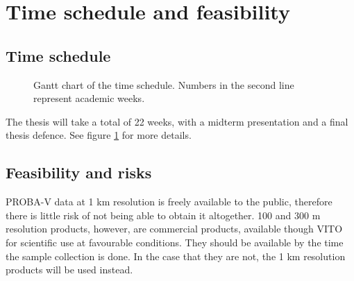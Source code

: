 \documentclass[a4paper,10pt]{article}
\begin{document}
\section{Time schedule and feasibility}

\subsection{Time schedule}

\begin{figure}
  \caption{Gantt chart of the time schedule. Numbers in the second line represent academic weeks.}
  \label{fig-gantt}
\end{figure}

The thesis will take a total of 22 weeks, with a midterm presentation and a final thesis defence. See figure \ref{fig-gantt} for more details.

\subsection{Feasibility and risks}

PROBA-V data at 1 km resolution is freely available to the public, therefore there is little risk of not being able to obtain it altogether. 100 and 300 m resolution products, however, are commercial products, available though VITO for scientific use at favourable conditions. They should be available by the time the sample collection is done. In the case that they are not, the 1 km resolution products will be used instead.
\end{document}
